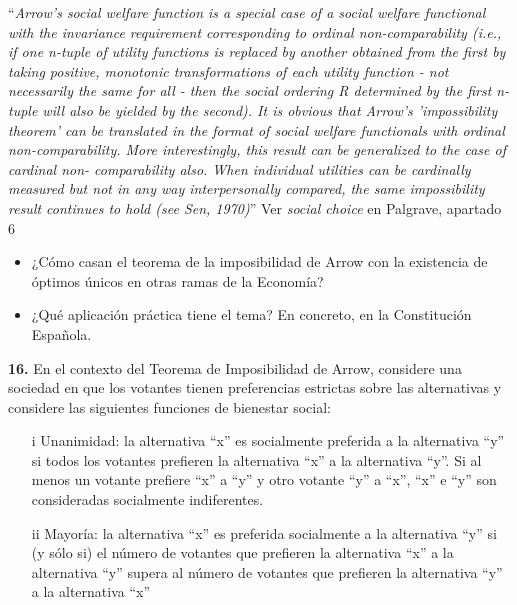 \documentclass{nuevotema}
\begin{document}

``\textit{Arrow's social welfare function is a special case of a
	social welfare functional with the invariance requirement
	corresponding to ordinal non-comparability (i.e., if
	one n-tuple of utility functions is replaced by another
	obtained from the first by taking positive, monotonic
	transformations of each utility function - not necessarily
	the same for all - then the social ordering R determined
	by the first n-tuple will also be yielded by the second). It
	is obvious that Arrow's 'impossibility theorem' can be
	translated in the format of social welfare functionals
	with ordinal non-comparability. More interestingly, this
	result can be generalized to the case of cardinal non-
	comparability also. When individual utilities can be
	cardinally measured but not in any way interpersonally
	compared, the same impossibility result continues to
	hold (see Sen, 1970)}'' Ver \textit{social choice} en Palgrave, apartado 6

\preguntas
{}
\begin{itemize}
    \item ¿Cómo casan el teorema de la imposibilidad de Arrow con la existencia de óptimos únicos en otras ramas de la Economía?
    \item ¿Qué aplicación práctica tiene el tema? En concreto, en la Constitución Española.
\end{itemize}


\textbf{16.} En el contexto del Teorema de Imposibilidad de Arrow, considere una sociedad en que los votantes tienen preferencias estrictas sobre las alternativas y considere las siguientes funciones de bienestar social:

\begin{itemize}
	\item[i] Unanimidad: la alternativa ``x'' es socialmente preferida a la alternativa ``y'' si todos los votantes prefieren la alternativa ``x'' a la alternativa ``y''. Si al menos un votante prefiere ``x'' a ``y'' y otro votante ``y'' a ``x'', ``x'' e ``y'' son consideradas socialmente indiferentes.
	\item[ii] Mayoría: la alternativa ``x'' es preferida socialmente a la alternativa ``y'' si (y sólo si) el número de votantes que prefieren la alternativa ``x'' a la alternativa ``y'' supera al número de votantes que prefieren la alternativa ``y'' a la alternativa ``x''
\end{itemize}
\end{document}
